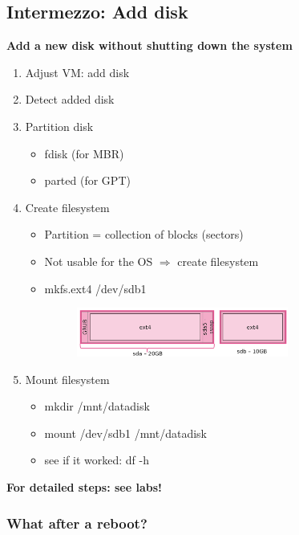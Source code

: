 \documentclass{article}
\begin{document}
\subsection{Intermezzo: Add disk}

\textbf{Add a new disk without shutting down the system}

\begin{enumerate}
    \item Adjust VM: add disk
    \item Detect added disk
    \item Partition disk
    \begin{itemize}
        \item fdisk (for MBR)
        \item parted (for GPT)
    \end{itemize}
    \item Create filesystem
    \begin{itemize}
        \item Partition = collection of blocks (sectors)
        \item Not usable for the OS $\Rightarrow$ create filesystem
        \item mkfs.ext4 /dev/sdb1
        \begin{figure}[H]
            \centering
            \includegraphics[width=0.7\textwidth]{create-filesystem.png}
            \caption{}
        \end{figure}
    \end{itemize}
    \item Mount filesystem
    \begin{itemize}
        \item mkdir /mnt/datadisk
        \item mount /dev/sdb1 /mnt/datadisk
        \item see if it worked: df -h
    \end{itemize}
\end{enumerate}

\textbf{For detailed steps: see labs!}


\subsubsection{What after a reboot?}
\end{document}
